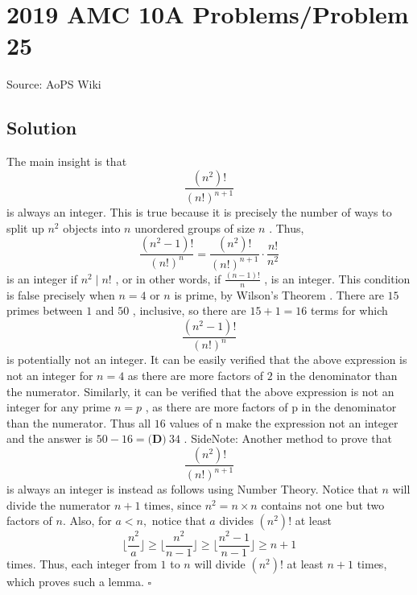 \documentclass[12pt]{article}
\begin{document}
\section*{{2019 AMC 10A Problems/Problem 25}}
Source: AoPS Wiki

\subsection*{Solution}
The main insight is that \[\frac{(n^2)!}{(n!)^{n+1}}\] is always an integer. This is true because it is precisely the number of ways to split up $n^2$ objects into $n$ unordered groups of size $n$ . Thus, \[\frac{(n^2-1)!}{(n!)^n}=\frac{(n^2)!}{(n!)^{n+1}}\cdot\frac{n!}{n^2}\] is an integer if $n^2 \mid n!$ , or in other words, if $\frac{(n-1)!}{n}$ , is an integer. This condition is false precisely when $n=4$ or $n$ is prime, by Wilson's Theorem . There are $15$ primes between $1$ and $50$ , inclusive, so there are $15 + 1 = 16$ terms for which \[\frac{(n^2-1)!}{(n!)^{n}}\] is potentially not an integer. It can be easily verified that the above expression is not an integer for $n=4$ as there are more factors of $2$ in the denominator than the numerator. Similarly, it can be verified that the above expression is not an integer for any prime $n=p$ , as there are more factors of p in the denominator than the numerator. Thus all $16$ values of n make the expression not an integer and the answer is $50-16=\boxed{\textbf{(D)}\ 34}$ . SideNote: Another method to prove that \[\frac{(n^2)!}{(n!)^{n+1}}\] is always an integer is instead as follows using Number Theory. Notice that $n$ will divide the numerator $n+1$ times, since $n^2 = n \times n$ contains not one but two factors of $n.$ Also, for $a < n,$ notice that $a$ divides $(n^2)!$ at least \[\lfloor \frac{n^2}{a} \rfloor \ge \lfloor \frac{n^2}{n-1} \rfloor \ge \lfloor \frac{n^2 - 1}{n-1} \rfloor \ge n+1\] times. Thus, each integer from $1$ to $n$ will divide $(n^2)!$ at least $n+1$ times, which proves such a lemma. $\square{}$
\end{document}
